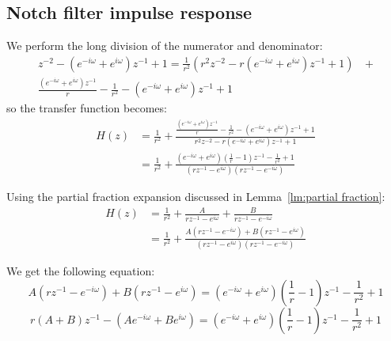 \subsection{Notch filter impulse response \faTrash}
We perform the long division of the numerator and denominator:
\begin{align*}
	z^{-2} - (e^{-i\omega} + e^{i\omega})z^{-1} + 1
	= \frac{1}{r^2}(r^2z^{-2} - r(e^{-i\omega} + e^{i\omega})z^{-1} + 1) & \,+ \\ \frac{(e^{-i\omega} + e^{i\omega})z^{-1}}{r} - \frac{1}{r^2} - (e^{-i\omega} + e^{i\omega})z^{-1} + 1
\end{align*}
so the transfer function becomes:
\begin{align*}
	H(z)
	 & = \frac{1}{r^2} + \frac{\frac{(e^{-i\omega} + e^{i\omega})z^{-1}}{r} - \frac{1}{r^2} - (e^{-i\omega} + e^{i\omega})z^{-1} + 1}{r^2z^{-2} - r(e^{-i\omega} + e^{i\omega})z^{-1} + 1}
	\\ &= \frac{1}{r^2} + \frac{(e^{-i\omega} + e^{i\omega})\left(\frac{1}{r} - 1\right)z^{-1} - \frac{1}{r^2} + 1}{(rz^{-1} - e^{i\omega})(rz^{-1} - e^{-i\omega})}
\end{align*}

Using the partial fraction expansion discussed in Lemma~\ref{lm:partial fraction}:
\begin{align*}
	H(z)
	 & = \frac{1}{r^2} + \frac{A}{rz^{-1} - e^{i\omega}} + \frac{B}{rz^{-1} - e^{-i\omega}}
	\\ &= \frac{1}{r^2} + \frac{A(rz^{-1} - e^{-i\omega}) + B(rz^{-1} - e^{i\omega})}{(rz^{-1} - e^{i\omega})(rz^{-1} - e^{-i\omega})}
\end{align*}

We get the following equation:
\[
	A(rz^{-1} - e^{-i\omega}) + B(rz^{-1} - e^{i\omega})
	= (e^{-i\omega} + e^{i\omega})\left(\frac{1}{r} - 1\right)z^{-1} - \frac{1}{r^2} + 1\]
\[
	r(A+B)z^{-1} - (Ae^{-i\omega} + Be^{i\omega})
	= (e^{-i\omega} + e^{i\omega})\left(\frac{1}{r} - 1\right)z^{-1} - \frac{1}{r^2} + 1\]

